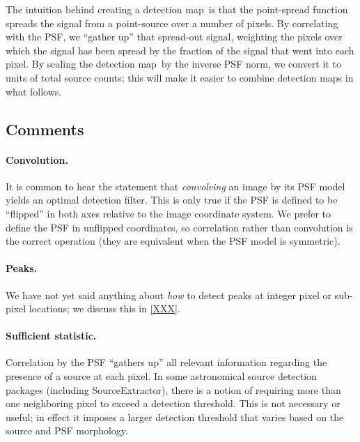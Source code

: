 \documentclass[letterpaper,preprint]{aastex}
\newcommand{\doctype}{paper}
\newcommand{\detmap}{detection map}
\newcommand{\snr}[1]{\mathbb{SN}(#1)}
\newcommand{\norm}[1]{\left\lVert #1 \right\rVert}
\renewcommand{\vec}[1]{\boldsymbol{#1}}
\newcommand{\kvec}{\vec{k}}
\begin{document}
The intuition behind creating a \detmap\ is that the point-spread
function spreads the signal from a point-source over a number of
pixels.  By correlating with the PSF, we ``gather up'' that spread-out
signal, weighting the pixels over which the signal has been spread by
the fraction of the signal that went into each pixel.  By scaling the
\detmap\ by the inverse PSF norm, we convert it to units of total
source counts; this will make it easier to combine \detmap s in what
follows.



\subsection{Comments}

\paragraph{Convolution.}  It is common to hear the statement
that \emph{convolving} an image by its PSF model yields an optimal
detection filter.  This is only true if the PSF is defined to be
``flipped'' in both axes relative to the image coordinate system.  We
prefer to define the PSF in unflipped coordinates, so correlation
rather than convolution is the correct operation (they are equivalent
when the PSF model is symmetric).




\paragraph{Peaks.}  We have not yet said anything about \emph{how} to
detect peaks at integer pixel or sub-pixel locations; we discuss this
in \ref{XXX}.


\paragraph{Sufficient statistic.}  Correlation by the PSF ``gathers
up'' all relevant information regarding the presence of a source at
each pixel.  In some astronomical source detection packages (including
SourceExtractor), there is a notion of requiring more than one
neighboring pixel to exceed a detection threshold.  This is not
necessary or useful; in effect it imposes a larger detection threshold
that varies based on the source and PSF morphology.
\end{document}
